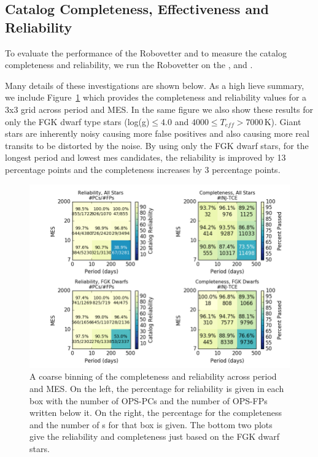 \subsection{Catalog Completeness, Effectiveness and Reliability}
\label{s:candr}

To evaluate the performance of the Robovetter and to measure the catalog completeness and reliability, we run the Robovetter on the ,  and . 

Many details of these investigations are shown below. As a high lieve summary, we include Figure~\ref{f:scoregrid} which provides the completeness and reliability values for a 3x3 grid across period and MES. In the same figure we also show these results for only the FGK dwarf type stars (log(g)$\leq4.0$ and $4000 \leq T_{eff} > 7000$\,K). Giant stars are inherently noisy causing more false positives and also causing more real transits to be distorted by the noise.  By using only the FGK dwarf stars, for the longest period and lowest mes candidates, the reliability is improved by 13 percentage points and the completeness increases by 3 percentage points.

\begin{figure}[h!]
\begin{center}
\includegraphics[width=0.95\linewidth]{fig-completeReliabilityCard.png}
\caption{ A coarse binning of the completeness and reliability across period and MES. On the left, the percentage for reliability is given in each box with the number of OPS-PCs and the number of OPS-FPs written below it.  On the right, the percentage for the completeness and the number of \injtce s for that box is given. The bottom two plots give the reliability and completeness just based on the FGK dwarf stars. }
\label{f:scoregrid}
\end{center}
\end{figure}


